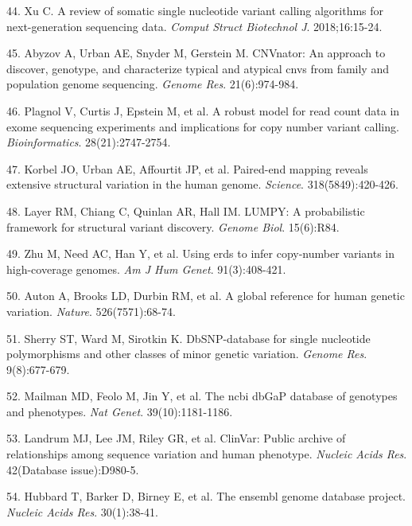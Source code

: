 \documentclass[11pt,letterpaper]{book}
\begin{document}
\leavevmode\hypertarget{ref-xu:2018aa}{}%
44. Xu C. A review of somatic single nucleotide variant calling algorithms for next-generation sequencing data. \emph{Comput Struct Biotechnol J}. 2018;16:15-24.

\leavevmode\hypertarget{ref-abyzov:2011aa}{}%
45. Abyzov A, Urban AE, Snyder M, Gerstein M. CNVnator: An approach to discover, genotype, and characterize typical and atypical cnvs from family and population genome sequencing. \emph{Genome Res}. 21(6):974-984.

\leavevmode\hypertarget{ref-plagnol:2012aa}{}%
46. Plagnol V, Curtis J, Epstein M, et al. A robust model for read count data in exome sequencing experiments and implications for copy number variant calling. \emph{Bioinformatics}. 28(21):2747-2754.

\leavevmode\hypertarget{ref-korbel:2007aa}{}%
47. Korbel JO, Urban AE, Affourtit JP, et al. Paired-end mapping reveals extensive structural variation in the human genome. \emph{Science}. 318(5849):420-426.

\leavevmode\hypertarget{ref-layer:2014aa}{}%
48. Layer RM, Chiang C, Quinlan AR, Hall IM. LUMPY: A probabilistic framework for structural variant discovery. \emph{Genome Biol}. 15(6):R84.

\leavevmode\hypertarget{ref-zhu:2012aa}{}%
49. Zhu M, Need AC, Han Y, et al. Using erds to infer copy-number variants in high-coverage genomes. \emph{Am J Hum Genet}. 91(3):408-421.

\leavevmode\hypertarget{ref-auton:2015aa}{}%
50. Auton A, Brooks LD, Durbin RM, et al. A global reference for human genetic variation. \emph{Nature}. 526(7571):68-74.

\leavevmode\hypertarget{ref-sherry:1999aa}{}%
51. Sherry ST, Ward M, Sirotkin K. DbSNP-database for single nucleotide polymorphisms and other classes of minor genetic variation. \emph{Genome Res}. 9(8):677-679.

\leavevmode\hypertarget{ref-mailman:2007aa}{}%
52. Mailman MD, Feolo M, Jin Y, et al. The ncbi dbGaP database of genotypes and phenotypes. \emph{Nat Genet}. 39(10):1181-1186.

\leavevmode\hypertarget{ref-landrum:2014aa}{}%
53. Landrum MJ, Lee JM, Riley GR, et al. ClinVar: Public archive of relationships among sequence variation and human phenotype. \emph{Nucleic Acids Res}. 42(Database issue):D980-5.

\leavevmode\hypertarget{ref-hubbard:2002aa}{}%
54. Hubbard T, Barker D, Birney E, et al. The ensembl genome database project. \emph{Nucleic Acids Res}. 30(1):38-41.
\end{document}
